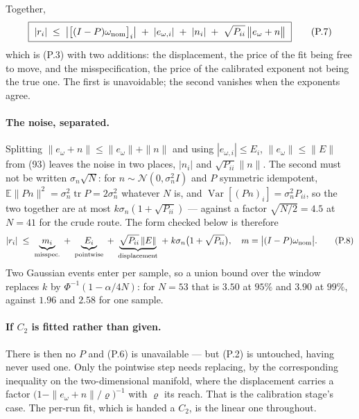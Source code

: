 \documentclass[10pt]{article}
\begin{document}
Together,
\begin{equation}
  \boxed{\;
  |r_i| \;\le\; \bigl|\bigl[(I-P)\omega_{\rm nom}\bigr]_i\bigr|
  \;+\; |e_{\omega,i}| \;+\; |n_i|
  \;+\; \sqrt{P_{ii}}\,\bigl\|e_\omega + n\bigr\| \;}
  \tag{P.7}
\end{equation}
which is (P.3) with two additions: the displacement, the price of the
fit being free to move, and the misspecification, the price of the
calibrated exponent not being the true one. The first is unavoidable;
the second vanishes when the exponents agree.

\paragraph{The noise, separated.} Splitting
$\|e_\omega+n\| \le \|e_\omega\| + \|n\|$ and using
$|e_{\omega,i}|\le E_i$, $\|e_\omega\|\le\|E\|$ from (93) leaves the
noise in two places, $|n_i|$ and $\sqrt{P_{ii}}\|n\|$. The second must
not be written $\sigma_n\sqrt N$: for $n\sim\mathcal N(0,\sigma_n^2I)$
and $P$ symmetric idempotent,
$\mathbb E\|Pn\|^2 = \sigma_n^2\operatorname{tr}P = 2\sigma_n^2$
whatever $N$ is, and $\operatorname{Var}[(Pn)_i] = \sigma_n^2P_{ii}$, so
the two together are at most $k\sigma_n(1+\sqrt{P_{ii}})$ --- against a
factor $\sqrt{N/2} = 4.5$ at $N = 41$ for the crude route. The form
checked below is therefore
\begin{equation}
  |r_i| \;\le\; \underbrace{m_i}_{\text{misspec.}}
  \;+\; \underbrace{E_i}_{\text{pointwise}}
  \;+\; \underbrace{\sqrt{P_{ii}}\,\|E\|}_{\text{displacement}}
  \;+\; k\sigma_n\bigl(1+\sqrt{P_{ii}}\bigr),
  \quad m = \bigl|(I-P)\omega_{\rm nom}\bigr| .
  \tag{P.8}
\end{equation}
Two Gaussian events enter per sample, so a union bound over the window
replaces $k$ by $\Phi^{-1}(1-\alpha/4N)$: for $N = 53$ that is $3.50$ at
$95\%$ and $3.90$ at $99\%$, against $1.96$ and $2.58$ for one sample.

\paragraph{If $C_2$ is fitted rather than given.} There is then no $P$
and (P.6) is unavailable --- but (P.2) is untouched, having never used
one. Only the pointwise step needs replacing, by the corresponding
inequality on the two-dimensional manifold, where the displacement
carries a factor $\bigl(1-\|e_\omega+n\|/\varrho\bigr)^{-1}$ with
$\varrho$ its reach. That is the calibration stage's case. The per-run
fit, which is handed a $C_2$, is the linear one throughout.
\end{document}
